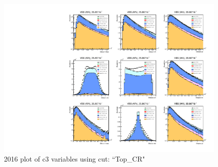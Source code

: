 \documentclass{article}
\begin{document}
                        \begin{figure}[H]
                            \centering
                            \caption{2016 plot of c3 variables using cut: ``Top\_CR"}
                            \includegraphics[width=\textwidth]{2016/c3_2016_Top_CR.pdf}
                        \end{figure}    
\end{document}
